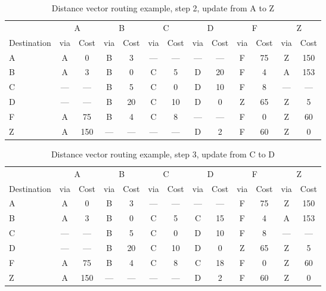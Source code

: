 \begin{table}
    \caption{Distance vector  routing example, step 2, update from A to Z }
    \label{tab:dv:step:2}
\begin{tabular}{l|c|c|c|c|c|c|c|c|c|c|c|c}
    \toprule
      & \multicolumn{2}{c|}{A}&\multicolumn{2}{c|}{B}&\multicolumn{2}{c|}{C}&\multicolumn{2}{c|}{D}&\multicolumn{2}{c|}{F}&\multicolumn{2}{c|}{Z} \\
    Destination & via&Cost&via&Cost&via&Cost&via&Cost&via&Cost&via&Cost \\ 
    \midrule
    A & A & 0 &B & 3 &--- & ---&--- & ---&F & 75 &Z & 150 
 \\B & A & 3 &B & 0 &C & 5 &D & 20 &F & 4 &A & 153 
 \\C & --- & ---&B & 5 &C & 0 &D & 10 &F & 8 &--- & ---
 \\D & --- & ---&B & 20 &C & 10 &D & 0 &Z & 65 &Z & 5 
 \\F & A & 75 &B & 4 &C & 8 &--- & ---&F & 0 &Z & 60 
 \\Z & A & 150 &--- & ---&--- & ---&D & 2 &F & 60 &Z & 0 
    \\ \bottomrule 
\end{tabular}
\end{table}
    

\begin{table}
    \caption{Distance vector  routing example, step 3, update from C to D }
    \label{tab:dv:step:3}
\begin{tabular}{l|c|c|c|c|c|c|c|c|c|c|c|c}
    \toprule
      & \multicolumn{2}{c|}{A}&\multicolumn{2}{c|}{B}&\multicolumn{2}{c|}{C}&\multicolumn{2}{c|}{D}&\multicolumn{2}{c|}{F}&\multicolumn{2}{c|}{Z} \\
    Destination & via&Cost&via&Cost&via&Cost&via&Cost&via&Cost&via&Cost \\ 
    \midrule
    A & A & 0 &B & 3 &--- & ---&--- & ---&F & 75 &Z & 150 
 \\B & A & 3 &B & 0 &C & 5 &C & 15 &F & 4 &A & 153 
 \\C & --- & ---&B & 5 &C & 0 &D & 10 &F & 8 &--- & ---
 \\D & --- & ---&B & 20 &C & 10 &D & 0 &Z & 65 &Z & 5 
 \\F & A & 75 &B & 4 &C & 8 &C & 18 &F & 0 &Z & 60 
 \\Z & A & 150 &--- & ---&--- & ---&D & 2 &F & 60 &Z & 0 
    \\ \bottomrule 
\end{tabular}
\end{table}
    

